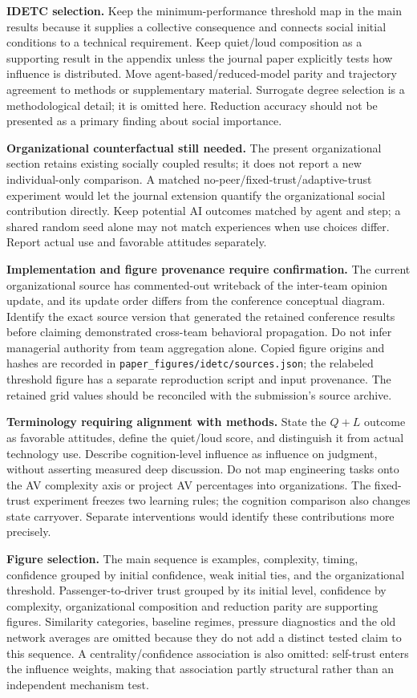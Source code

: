 \documentclass[11pt]{article}
\begin{document}
\textbf{IDETC selection.} Keep the minimum-performance threshold map in the
main results because it supplies a collective consequence and connects social
initial conditions to a technical requirement. Keep quiet/loud composition
as a supporting result in the appendix unless the journal paper explicitly
tests how influence is distributed. Move agent-based/reduced-model parity and
trajectory agreement to methods or supplementary material. Surrogate degree
selection is a methodological detail; it is omitted here. Reduction accuracy
should not be presented as a primary finding about social importance.

\textbf{Organizational counterfactual still needed.} The present organizational
section retains existing socially coupled results; it does not report a new
individual-only comparison. A matched no-peer/fixed-trust/adaptive-trust
experiment would let the journal extension quantify the organizational social
contribution directly. Keep potential AI outcomes matched by agent and step;
a shared random seed alone may not match experiences when use choices differ.
Report actual use and favorable attitudes separately.

\textbf{Implementation and figure provenance require confirmation.} The current
organizational source has commented-out writeback of the inter-team opinion
update, and its update order differs from the conference conceptual diagram.
Identify the exact source version that generated the retained conference
results before claiming demonstrated cross-team behavioral propagation.
Do not infer managerial authority from team aggregation alone. Copied figure
origins and hashes are recorded in \verb|paper_figures/idetc/sources.json|;
the relabeled threshold figure has a separate reproduction script and input
provenance. The retained grid values should be reconciled with the submission's
source archive.

\textbf{Terminology requiring alignment with methods.} State the $Q+L$ outcome
as favorable attitudes, define the quiet/loud score, and distinguish it from
actual technology use. Describe cognition-level influence as influence on
judgment, without asserting measured deep discussion. Do not map engineering
tasks onto the AV complexity axis or project AV percentages into organizations.
The fixed-trust experiment freezes two learning rules; the cognition comparison
also changes state carryover. Separate interventions would identify these
contributions more precisely.

\textbf{Figure selection.} The main sequence is examples, complexity, timing,
confidence grouped by initial confidence, weak initial ties, and the
organizational threshold. Passenger-to-driver trust grouped by its initial
level, confidence by complexity, organizational composition and reduction
parity are supporting figures. Similarity categories, baseline regimes,
pressure diagnostics and the old network averages are omitted because they
do not add a distinct tested claim to this sequence. A centrality/confidence
association is also omitted: self-trust enters the influence weights, making
that association partly structural rather than an independent mechanism test.
\end{document}
